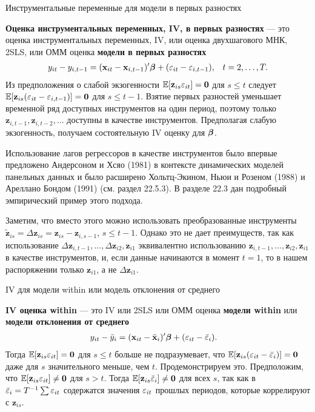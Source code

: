 {\centering  Инструментальные переменные для модели в первых разностях}

\textbf{Оценка инструментальных переменных, IV, в первых разностях} --- это оценка инструментальных переменных, IV, или оценка двухшагового МНК, 2SLS, или ОММ оценка \textbf{модели в первых разностях}
\begin{align}
& y_{it}-y_{i,t-1}=(\mathbf{x}_{it}-\mathbf{x}_{i,t-1})'\bm{\beta} + (\varepsilon_{it}- \varepsilon_{i,t-1}),
& t=2, \dots, T.
\label{Eq:22.25}
\end{align}
Из предположения о слабой экзогенности $\mathbb{E}[ \mathbf z_{is} \varepsilon_{it}]=\mathbf 0$ для $s \leq t$ следует
$\mathbb{E}[\mathbf z_{is} (\varepsilon_{it}-\varepsilon_{i,t-1})]=\mathbf 0$ для $s \leq  t-1$. Взятие первых разностей уменьшает временной ряд доступных инструментов на один период, поэтому только $\mathbf z_{i,t-1}, \mathbf z_{i,t-2}, \dots$ доступны в качестве инструментов. Предполагая слабую экзогенность, получаем состоятельную IV оценку для $\bm{\beta}$.

Использование лагов регрессоров в качестве инструментов было впервые предложено Андерсоном и Хсяо (1981) в контексте динамических моделей панельных данных и было расширено Хольтц-Экином, Ньюи и Розеном (1988) и Ареллано Бондом (1991) (см. раздел 22.5.3). В разделе 22.3  дан подробный эмпирический пример этого подхода.

Заметим, что вместо этого можно использовать преобразованные инструменты $\tilde{\mathbf z}_{is}=\Delta \mathbf z_{is}=\mathbf z_{is}-\mathbf z_{i,s-1}$, $s \leq t-1$. Однако это не дает преимуществ, так как использование $\Delta \mathbf z_{i,t-1}, \dots, \Delta \mathbf z_{i2}, \mathbf z_{i1}$ эквивалентно использованию $\mathbf z_{i,t-1}, \dots, \mathbf z_{i2}, \mathbf z_{i1}$ в качестве инструментов, и, если данные начинаются в момент $t=1$, то в нашем распоряжении только $\mathbf z_{i1}$, а не $\Delta \mathbf z_{i1}$.

{\centering  IV для модели within или модель отклонения от среднего }

\textbf{IV оценка within} --- это IV или 2SLS или ОММ оценка \textbf{модели within} или \textbf{модели отклонения от среднего}
\begin{align}
& y_{it}-\bar{y}_{i}=(\mathbf{x}_{it}-\bar{\mathbf{x}}_{i})'\bm{\beta} + (\varepsilon_{it}- \bar{\varepsilon}_{i}).
\label{Eq:22.26}
\end{align}
Тогда $\mathbb{E}[\mathbf z_{is} \varepsilon_{it}]=\mathbf 0$ для $s \leq t$ больше не подразумевает, что $\mathbb{E}[\mathbf z_{is} (\varepsilon_{it}-\bar{\varepsilon}_i)]=\mathbf 0$ даже для $s$ значительного меньше, чем $t$. Продемонстрируем это. Предположим, что $\mathbb{E}[\mathbf z_{is} \varepsilon_{it}] \neq \mathbf 0$ для $s > t$. Тогда $\mathbb{E}[\mathbf z_{is} \bar{\varepsilon}_i] \neq \mathbf 0$ для всех $s$, так как в $\bar{\varepsilon}_i=T^{-1}\sum \varepsilon_{it}$ содержатся значения $\varepsilon_{it}$ прошлых периодов, которые коррелируют с $\mathbf z_{is}$.


